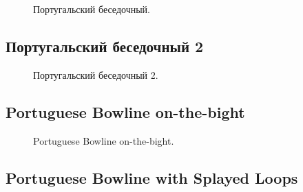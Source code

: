 \begin{figure}[H]\centering
	\begin{minipage}{1\linewidth}
		\begin{center}
			\tcbox[enhanced jigsaw,colframe=black,opacityframe=0.5,opacityback=0.5]
			{\centering{}}
		\end{center}
	\end{minipage}
\caption{Португальский беседочный.}
\label{ris:Portuguese_bowline}
\end{figure}

\subsection{Португальский беседочный 2}

\begin{figure}[H]\centering
	\begin{minipage}{1\linewidth}
		\begin{center}
			\tcbox[enhanced jigsaw,colframe=black,opacityframe=0.5,opacityback=0.5]
			{\centering{}}
		\end{center}
	\end{minipage}
\caption{Португальский беседочный 2.}
\label{ris:Portuguese_bowline_2}
\end{figure}

\subsection{Portuguese Bowline on-the-bight}

\begin{figure}[H]\centering
	\begin{minipage}{1\linewidth}
		\begin{center}
			\tcbox[enhanced jigsaw,colframe=black,opacityframe=0.5,opacityback=0.5]
			{\centering{}}
		\end{center}
	\end{minipage}
\caption{Portuguese Bowline on-the-bight.}
\label{ris:Portuguese_Bowline_on-the-bight}
\end{figure}

\subsection{Portuguese Bowline with Splayed Loops}

